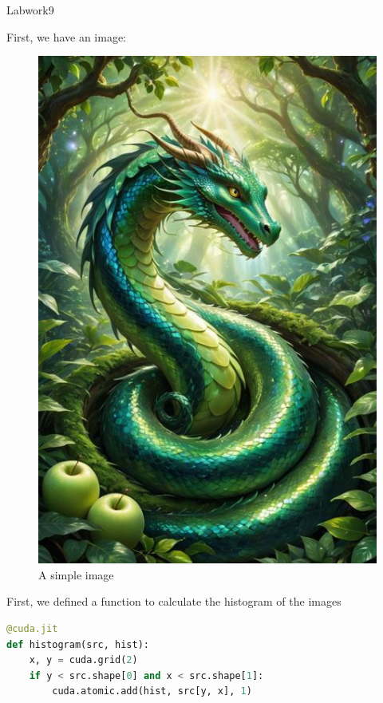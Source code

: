 \documentclass[12pt]{article}
\begin{document}
\begin{center}
    \vspace*{1.8cm}
    \Large
    Labwork9\\
\end{center}

\noindent
First, we have an image:
\begin{figure}[H]
\centering
    \includegraphics[height = 0.5\textheight, keepaspectratio]{images/image.jpeg}
    \caption{A simple image}
\end{figure}


\noindent
First, we defined a function to calculate the histogram of the images

\begin{lstlisting}[language=Python]
@cuda.jit
def histogram(src, hist):
    x, y = cuda.grid(2)
    if y < src.shape[0] and x < src.shape[1]:
        cuda.atomic.add(hist, src[y, x], 1)
\end{lstlisting}
\end{document}
